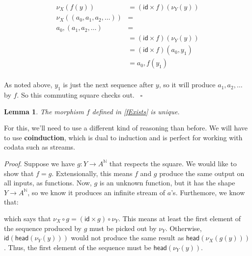 \documentclass{article}
\theoremstyle{plain}
\newtheorem{lemma}{Lemma}
\theoremstyle{definition}
\begin{document}
\[
\begin{aligned}
{\nu }_{X} \left( f\left( y \right) \right) & = \left( \mathsf{id} \times f \right) \left( {\nu }_{Y} \left( y \right) \right) \\ {\nu }_{X} \left( \left( {a}_{0}, {a}_{1}, {a}_{2}, \ldots \right) \right) & = \\ {a}_{0}, \left( {a}_{1}, {a}_{2}, \ldots \right) & = \\ & = \left( \mathsf{id} \times f \right) \left( {\nu }_{Y} \left( y \right) \right) \\ & = \left( \mathsf{id} \times f \right) \left( {a}_{0}, {y}_{1} \right) \\ & = {a}_{0}, f\left( {y}_{1} \right) \\
\end{aligned}
\]

As noted above, \ensuremath{{y}_{1}} is just the next sequence after \ensuremath{y}, so it will produce \ensuremath{{a}_{1}, {a}_{2}, \ldots} by \ensuremath{f}. So this commuting square checks out.  ~\ensuremath{\square}

\begin{lemma}
The morphism \ensuremath{f} defined in \ref{fExists} is unique.
\end{lemma}
\label{fUnique} 

For this, we'll need to use a different kind of reasoning than before. We will have to use \textbf{coinduction}, which is dual to induction and is perfect for working with codata such as streams.

\emph{Proof}.  Suppose we have \ensuremath{g : Y \rightarrow {A}^{\mathbb{N} }} that respects the square. We would like to show that \ensuremath{f = g}. Extensionally, this means \ensuremath{f} and \ensuremath{g} produce the same output on all inputs, as functions. Now, \ensuremath{g} is an unknown function, but it has the shape \ensuremath{Y \rightarrow {A}^{\mathbb{N} }}, so we know it produces an infinite stream of \ensuremath{a}'s. Furthemore, we know that: 
\begin{center}
\end{center}
 which says that \ensuremath{{\nu }_{X} \circ g = \left( \mathsf{id} \times g \right) \circ {\nu }_{Y}}. This means at least the first element of the sequence produced by \ensuremath{g} must be picked out by \ensuremath{{\nu }_{Y}}. Otherwise, \ensuremath{\mathsf{id}\left( \mathsf{head}\left( {\nu }_{Y} \left( y \right) \right) \right)} would not produce the same result as \ensuremath{\mathsf{head}\left( {\nu }_{X} \left( g\left( y \right) \right) \right)}. Thus, the first element of the sequence must be \ensuremath{\mathsf{head}\left( {\nu }_{Y} \left( y \right) \right)}.
\end{document}
